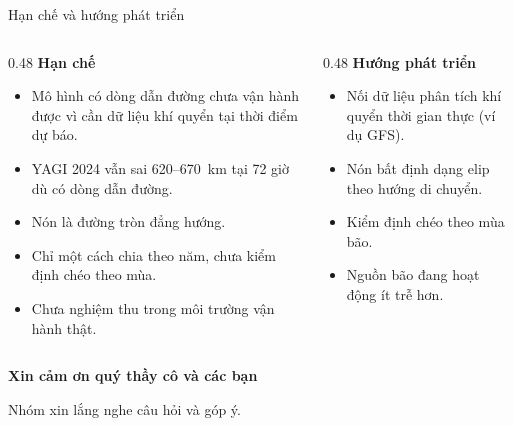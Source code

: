 \documentclass[aspectratio=169, 11pt]{beamer}
\begin{document}
\begin{frame}{Hạn chế và hướng phát triển}
  \begin{columns}[T]
    \begin{column}{0.48\textwidth}
      \textbf{Hạn chế}
      \begin{itemize}
        \item Mô hình có dòng dẫn đường chưa vận hành được vì cần dữ liệu khí
              quyển tại thời điểm dự báo.
        \item YAGI 2024 vẫn sai 620--670~km tại 72 giờ dù có dòng dẫn đường.
        \item Nón là đường tròn đẳng hướng.
        \item Chỉ một cách chia theo năm, chưa kiểm định chéo theo mùa.
        \item Chưa nghiệm thu trong môi trường vận hành thật.
      \end{itemize}
    \end{column}
    \begin{column}{0.48\textwidth}
      \textbf{Hướng phát triển}
      \begin{itemize}
        \item Nối dữ liệu phân tích khí quyển thời gian thực (ví dụ GFS).
        \item Nón bất định dạng elip theo hướng di chuyển.
        \item Kiểm định chéo theo mùa bão.
        \item Nguồn bão đang hoạt động ít trễ hơn.
      \end{itemize}
    \end{column}
  \end{columns}
\end{frame}

\begin{frame}[plain]
  \centering
  \vfill
  {\Huge\bfseries\color{daunavy} Xin cảm ơn quý thầy cô và các bạn}

  \vspace{1.2em}
  {\large Nhóm xin lắng nghe câu hỏi và góp ý.}
  \vfill
\end{frame}
\end{document}
